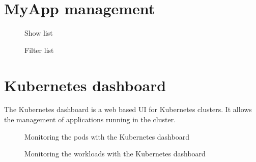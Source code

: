 \begin{appendices}
    \section{MyApp management}
    \begin{figure}[H]
        \centering
        \caption*{Show list}
    \end{figure}
    \begin{figure}[H]
        \centering
        \caption*{Filter list}
    \end{figure}

    \section{Kubernetes dashboard}
    The Kubernetes dashboard is a web based UI for Kubernetes clusters.
    It allows the management of applications running in the cluster.
    \begin{figure}[H]
        \centering
        \caption*{Monitoring the pods with the Kubernetes dashboard}
    \end{figure}
    \begin{figure}[H]
        \centering
        \caption*{Monitoring the workloads with the Kubernetes dashboard}
    \end{figure}
    \newpage
\end{appendices}
